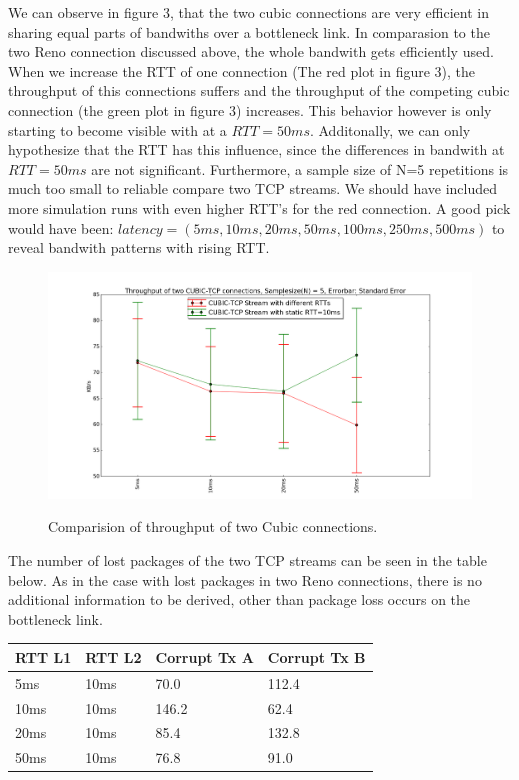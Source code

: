 We can observe in figure 3, that the two cubic connections are very efficient in sharing equal parts of bandwiths over a bottleneck link. In comparasion to the two Reno connection discussed above, the whole bandwith gets efficiently used. When we increase the RTT of one connection (The red plot in figure 3), the throughput of this connections suffers and the throughput of the competing cubic connection (the green plot in figure 3) increases. This behavior however is only starting to become visible with at a $RTT=50ms$. Additonally, we can only hypothesize that the RTT has this influence, since the differences in bandwith at $RTT=50ms$ are not significant. Furthermore, a sample size of N=5 repetitions is much too small to reliable compare two TCP streams. We should have included more simulation runs with even higher RTT's for the red connection. A good pick would have been: $latency=(5ms, 10ms, 20ms, 50ms, 100ms, 250ms, 500ms)$ to reveal bandwith patterns with rising RTT.

\begin{figure}[H]
	\centering
	\includegraphics[width=6in]{img/cubic.png}
	\caption[reno]
	\label{fig:cubic}
	{Comparision of throughput of two Cubic connections.}
\end{figure}

The number of lost packages of the two TCP streams can be seen in the table below. As in the case with lost packages in two Reno connections, there is no additional information to be derived, other than package loss occurs on the bottleneck link.
\begin{table}[H]
\centering
\begin{tabular}{|l|l|l|l|}
\hline
\textbf{RTT L1} & \textbf{RTT L2} & \textbf{Corrupt Tx A} & \textbf{Corrupt Tx B} \\ \hline
5ms             & 10ms            &        70.0               &         112.4              \\ \hline
10ms            & 10ms            &         146.2              &        62.4               \\ \hline
20ms            & 10ms            &       85.4                &         132.8              \\ \hline
50ms            & 10ms            &       76.8                &         91.0              \\ \hline
\end{tabular}
\end{table}
